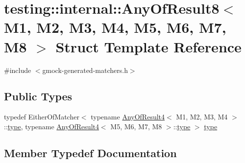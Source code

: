 \hypertarget{structtesting_1_1internal_1_1_any_of_result8}{}\section{testing\+::internal\+::Any\+Of\+Result8$<$ M1, M2, M3, M4, M5, M6, M7, M8 $>$ Struct Template Reference}
\label{structtesting_1_1internal_1_1_any_of_result8}


{\ttfamily \#include $<$gmock-\/generated-\/matchers.\+h$>$}

\subsection*{Public Types}
\begin{DoxyCompactItemize}
\item 
typedef Either\+Of\+Matcher$<$ typename \mbox{\hyperlink{structtesting_1_1internal_1_1_any_of_result4}{Any\+Of\+Result4}}$<$ M1, M2, M3, M4 $>$\+::\mbox{\hyperlink{structtesting_1_1internal_1_1_any_of_result8_a8f8a1e78a019965c24bd22c78885747d}{type}}, typename \mbox{\hyperlink{structtesting_1_1internal_1_1_any_of_result4}{Any\+Of\+Result4}}$<$ M5, M6, M7, M8 $>$\+::\mbox{\hyperlink{structtesting_1_1internal_1_1_any_of_result8_a8f8a1e78a019965c24bd22c78885747d}{type}} $>$ \mbox{\hyperlink{structtesting_1_1internal_1_1_any_of_result8_a8f8a1e78a019965c24bd22c78885747d}{type}}
\end{DoxyCompactItemize}


\subsection{Member Typedef Documentation}
\mbox{\label{structtesting_1_1internal_1_1_any_of_result8_a8f8a1e78a019965c24bd22c78885747d}} 
